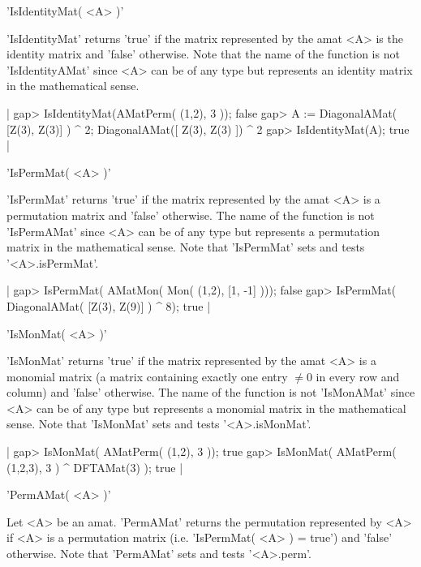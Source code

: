 
'IsIdentityMat( <A> )'

'IsIdentityMat' returns 'true' if the matrix represented by 
the amat <A> is the identity matrix and 'false' otherwise. 
Note that the name of the function 
is not 'IsIdentityAMat' since <A> can be of any type but represents an
identity matrix in the mathematical sense. 

|    gap> IsIdentityMat(AMatPerm( (1,2), 3 ));
    false
    gap> A := DiagonalAMat( [Z(3), Z(3)] ) ^ 2;  
    DiagonalAMat([ Z(3), Z(3) ]) ^ 2
    gap> IsIdentityMat(A);                   
    true |


'IsPermMat( <A> )'

'IsPermMat' returns 'true' if the matrix represented by the amat <A> is 
a permutation matrix and 'false' otherwise. The name of the function 
is not 'IsPermAMat' since <A> can be of any type but represents a 
permutation matrix in the mathematical sense. 
Note that 'IsPermMat' sets and tests '<A>.isPermMat'.

|    gap> IsPermMat( AMatMon( Mon( (1,2), [1, -1] )));
    false
    gap> IsPermMat( DiagonalAMat( [Z(3), Z(9)] ) ^ 8);
    true |


'IsMonMat( <A> )'

'IsMonMat' returns 'true' if the matrix represented by the amat <A> is 
a monomial matrix (a matrix containing exactly one entry $\neq 0$ 
in every row and column) and 'false' otherwise. 
The name of the function is not 'IsMonAMat'
since <A> can be of any type but represents a monomial matrix
in the mathematical sense. Note that 'IsMonMat' sets and tests 
'<A>.isMonMat'.

|    gap> IsMonMat( AMatPerm( (1,2), 3 ));
    true
    gap> IsMonMat( AMatPerm( (1,2,3), 3 ) ^ DFTAMat(3) );
    true |


'PermAMat( <A> )'

Let <A> be an amat. 'PermAMat' returns the permutation represented 
by <A> if <A> is a permutation matrix (i.e. 'IsPermMat( <A> ) = true')
and 'false' otherwise. Note that 'PermAMat' sets and tests '<A>.perm'.

